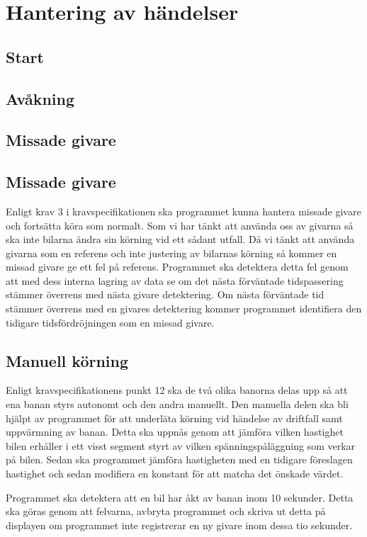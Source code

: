 \section{Hantering av händelser}

\subsection{Start} 

\subsection{Avåkning} 

\subsection{Missade givare} 


\subsection{Missade givare}

Enligt krav 3 i kravspecifikationen ska programmet kunna hantera missade givare och fortsätta köra som normalt. Som vi har tänkt att använda oss av givarna så ska inte bilarna ändra sin körning vid ett sådant utfall. Då vi tänkt att använda givarna som en referens och inte justering av bilarnas körning så kommer en missad givare ge ett fel på referens. Programmet ska detektera detta fel genom att med dess interna lagring av data se om det nästa förväntade tidspassering stämmer överrens med nästa givare detektering. Om nästa förväntade tid stämmer överrens med en givares detektering kommer programmet identifiera den tidigare tidsfördröjningen som en missad givare.


\subsection{Manuell körning}
Enligt kravspecifikationens punkt 12 ska de två olika banorna delas upp så att ena banan styrs autonomt och den andra manuellt. 
Den manuella delen ska bli hjälpt av programmet för att underläta körning vid händelse av driftfall samt uppvärmning av banan.
Detta ska uppnås genom att jämföra vilken hastighet bilen erhåller i ett visst segment styrt av vilken spänningspåläggning som verkar på bilen.
Sedan ska programmet  jämföra hastigheten med en tidigare föreslagen hastighet och sedan modifiera en konstant för att matcha det önskade värdet.

Programmet ska detektera att en bil har åkt av banan inom 10 sekunder. Detta ska göras genom att felvarna, avbryta programmet och skriva ut detta på displayen om programmet inte registrerar en ny givare inom dessa tio sekunder.
